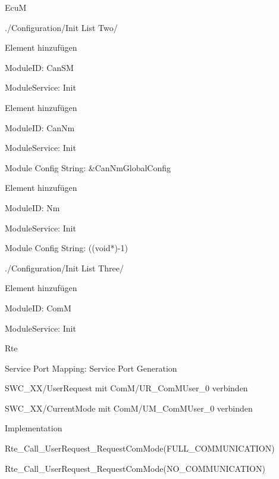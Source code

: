 \begin{compactitem}
    \item EcuM
    \begin{compactitem}
        \item ./Configuration/Init List Two/
        \begin{compactitem}
            \item Element hinzufügen
            \item ModuleID: CanSM
            \item ModuleService: Init
            \item Element hinzufügen
            \item ModuleID: CanNm
            \item ModuleService: Init
            \item Module Config String: \&CanNmGlobalConfig
            \item Element hinzufügen
            \item ModuleID: Nm
            \item ModuleService: Init
            \item Module Config String: ((void*)-1)
        \end{compactitem}
        \item ./Configuration/Init List Three/
        \begin{compactitem}
            \item Element hinzufügen
            \item ModuleID: ComM
            \item ModuleService: Init
        \end{compactitem}
    \end{compactitem}
    \item Rte
    \begin{compactitem}
        \item Service Port Mapping: Service Port Generation
        \item SWC\_XX/UserRequest mit ComM/UR\_ComMUser\_0 verbinden
        \item SWC\_XX/CurrentMode mit ComM/UM\_ComMUser\_0 verbinden
    \end{compactitem}
    \item Implementation
    \begin{compactitem}
        \item Rte\_Call\_UserRequest\_RequestComMode(FULL\_COMMUNICATION)
        \item Rte\_Call\_UserRequest\_RequestComMode(NO\_COMMUNICATION)
    \end{compactitem}





\end{compactitem}
























